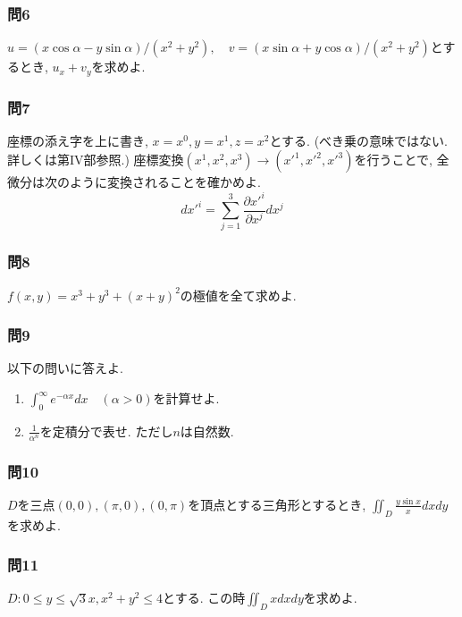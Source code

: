 \documentclass[a4j,dvipdfmx]{jsarticle}
\numberwithin{equation}{section}
\begin{document}
            \subsubsection*{問6} $u=(x\cos\alpha-y\sin\alpha)/(x^2+y^2),\quad v=(x\sin\alpha+y\cos\alpha)/(x^2+y^2)$とするとき, $u_x+v_y$を求めよ.

            \subsubsection*{問7} 座標の添え字を上に書き, $x=x^0,y=x^1,z=x^2$とする. (べき乗の意味ではない. 詳しくは第IV部参照.) 座標変換$(x^1,x^2,x^3)\to (x'^1,x'^2,x'^3)$を行うことで, 全微分は次のように変換されることを確かめよ.
                \begin{equation*}
                    dx'^i = \sum_{j=1}^{3}\frac{\partial x'^i}{\partial x^j}dx^j
                \end{equation*}
            
            \subsubsection*{問8} $f(x,y)=x^3+y^3+(x+y)^2$の極値を全て求めよ.

            \subsubsection*{問9} 以下の問いに答えよ.
                \begin{enumerate}\renewcommand{\labelenumi}{(\roman{enumi})}
                    \item $\displaystyle \int_{0}^{\infty}e^{-\alpha x}dx \quad (\alpha>0)$を計算せよ.
                    \item $\frac{1}{\alpha^n}$を定積分で表せ. ただし$n$は自然数.
                \end{enumerate}
            
            \subsubsection*{問10} $D$を三点$(0,0),(\pi,0),(0,\pi)$を頂点とする三角形とするとき, $\displaystyle \iint_D \frac{y\sin x}{x}dxdy$を求めよ.
            
            \subsubsection*{問11} $D:0\leq y\leq \sqrt{3}x,x^2+y^2\leq 4$とする. この時$\displaystyle \iint_D xdxdy$を求めよ.
\end{document}
